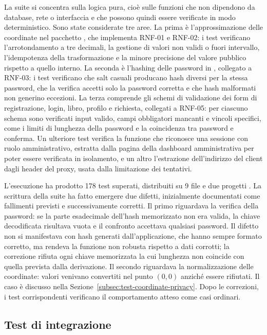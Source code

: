 La suite si concentra sulla logica pura, cioè sulle funzioni che non dipendono da database, rete o interfaccia e che possono quindi essere verificate in modo deterministico. Sono state considerate tre aree. La prima è l'approssimazione delle coordinate nel pacchetto , che implementa RNF-01 e RNF-02: i test verificano l'arrotondamento a tre decimali, la gestione di valori non validi o fuori intervallo, l'idempotenza della trasformazione e la minore precisione del valore pubblico rispetto a quello interno. La seconda è l'hashing delle password in , collegato a RNF-03: i test verificano che salt casuali producano hash diversi per la stessa password, che la verifica accetti solo la password corretta e che hash malformati non generino eccezioni. La terza comprende gli schemi di validazione  dei form di registrazione, login, libro, profilo e richiesta, collegati a RNF-05: per ciascuno schema sono verificati input valido, campi obbligatori mancanti e vincoli specifici, come i limiti di lunghezza della password e la coincidenza tra password e conferma. Un ulteriore test verifica la funzione che riconosce una sessione con ruolo amministrativo, estratta dalla pagina della dashboard amministrativa per poter essere verificata in isolamento, e un altro l'estrazione dell'indirizzo del client dagli header del proxy, usata dalla limitazione dei tentativi.

L'esecuzione ha prodotto 178 test superati, distribuiti su 9 file e due progetti \nx{}. La scrittura della suite ha fatto emergere due difetti, inizialmente documentati come fallimenti previsti e successivamente corretti. Il primo riguardava la verifica della password: se la parte esadecimale dell'hash memorizzato non era valida, la chiave decodificata risultava vuota e il confronto accettava qualsiasi password. Il difetto non si manifestava con hash generati dall'applicazione, che hanno sempre formato corretto, ma rendeva la funzione non robusta rispetto a dati corrotti; la correzione rifiuta ogni chiave memorizzata la cui lunghezza non coincide con quella prevista dalla derivazione. Il secondo riguardava la normalizzazione delle coordinate: valori  venivano convertiti nel punto $(0, 0)$ anziché essere rifiutati. Il caso è discusso nella Sezione~\ref{subsec:test-coordinate-privacy}. Dopo le correzioni, i test corrispondenti verificano il comportamento atteso come casi ordinari.

\subsection{Test di integrazione}
\label{subsec:integration-testing}

